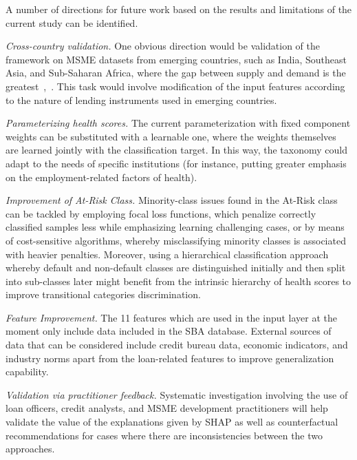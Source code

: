 A number of directions for future work based on the results and limitations of the current study can be identified.

\textit{Cross-country validation.} One obvious direction would be validation of the framework on MSME datasets from emerging countries, such as India, Southeast Asia, and Sub-Saharan Africa, where the gap between supply and demand is the greatest~\cite{6},~\cite{7}. This task would involve modification of the input features according to the nature of lending instruments used in emerging countries.

\textit{Parameterizing health scores.} The current parameterization with fixed component weights can be substituted with a learnable one, where the weights themselves are learned jointly with the classification target. In this way, the taxonomy could adapt to the needs of specific institutions (for instance, putting greater emphasis on the employment-related factors of health).

\textit{Improvement of At-Risk Class.} Minority-class issues found in the At-Risk class can be tackled by employing focal loss functions, which penalize correctly classified samples less while emphasizing learning challenging cases, or by means of cost-sensitive algorithms, whereby misclassifying minority classes is associated with heavier penalties. Moreover, using a hierarchical classification approach whereby default and non-default classes are distinguished initially and then split into sub-classes later might benefit from the intrinsic hierarchy of health scores to improve transitional categories discrimination.

\textit{Feature Improvement.} The 11 features which are used in the input layer at the moment only include data included in the SBA database. External sources of data that can be considered include credit bureau data, economic indicators, and industry norms apart from the loan-related features to improve generalization capability.

\textit{Validation via practitioner feedback.} Systematic investigation involving the use of loan officers, credit analysts, and MSME development practitioners will help validate the value of the explanations given by SHAP as well as counterfactual recommendations for cases where there are inconsistencies between the two approaches.
